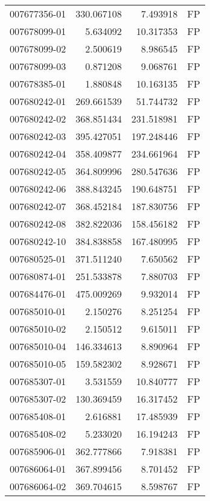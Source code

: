 \begin{tabular}{lrrl}
007677356-01 &  330.067108 &       7.493918 &   FP \\
007678099-01 &    5.634092 &      10.317353 &   FP \\
007678099-02 &    2.500619 &       8.986545 &   FP \\
007678099-03 &    0.871208 &       9.068761 &   FP \\
007678385-01 &    1.880848 &      10.163135 &   FP \\
007680242-01 &  269.661539 &      51.744732 &   FP \\
007680242-02 &  368.851434 &     231.518981 &   FP \\
007680242-03 &  395.427051 &     197.248446 &   FP \\
007680242-04 &  358.409877 &     234.661964 &   FP \\
007680242-05 &  364.809996 &     280.547636 &   FP \\
007680242-06 &  388.843245 &     190.648751 &   FP \\
007680242-07 &  368.452184 &     187.830756 &   FP \\
007680242-08 &  382.822036 &     158.456182 &   FP \\
007680242-10 &  384.838858 &     167.480995 &   FP \\
007680525-01 &  371.511240 &       7.650562 &   FP \\
007680874-01 &  251.533878 &       7.880703 &   FP \\
007684476-01 &  475.009269 &       9.932014 &   FP \\
007685010-01 &    2.150276 &       8.251254 &   FP \\
007685010-02 &    2.150512 &       9.615011 &   FP \\
007685010-04 &  146.334613 &       8.890964 &   FP \\
007685010-05 &  159.582302 &       8.928671 &   FP \\
007685307-01 &    3.531559 &      10.840777 &   FP \\
007685307-02 &  130.369459 &      16.317452 &   FP \\
007685408-01 &    2.616881 &      17.485939 &   FP \\
007685408-02 &    5.233020 &      16.194243 &   FP \\
007685906-01 &  362.777866 &       7.918381 &   FP \\
007686064-01 &  367.899456 &       8.701452 &   FP \\
007686064-02 &  369.704615 &       8.598767 &   FP \\

\end{tabular}
